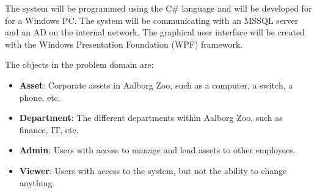 \par
The system will be programmed using the C\# language and will be developed for for a Windows PC. The system will be communicating with an MSSQL server and an AD on the internal network. The graphical user interface will be created with the Windows Presentation Foundation (WPF) framework.
\par
The objects in the problem domain are: 
\begin{itemize}
    \item \textbf{Asset}: Corporate assets in Aalborg Zoo, such as a computer, a switch, a phone, etc.

    \item \textbf{Department}: The different departments within Aalborg Zoo, such as finance, IT, etc.
    
    \item \textbf{Admin}: Users with access to manage and lend assets to other employees.
    
    \item \textbf{Viewer}: Users with access to the system, but not the ability to change anything.
    
\end{itemize}
